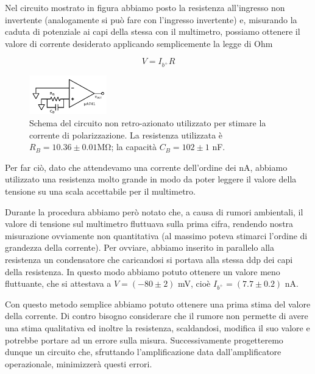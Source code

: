 Nel circuito mostrato in figura abbiamo posto la resistenza all'ingresso non invertente (analogamente si può fare con l'ingresso invertente) e, misurando la caduta di potenziale ai capi della stessa con il multimetro, possiamo ottenere il valore di corrente desiderato applicando semplicemente la legge di Ohm

$$V=I_{b^+} R$$


\begin{figure}
  \begin{center}
    \includegraphics[width=0.30\textwidth]{../E02/latex/direct_measure.pdf}
  \end{center}
  \caption{Schema del circuito non retro-azionato utilizzato per stimare la corrente di polarizzazione. La resistenza utilizzata è $R_B=10.36\pm0.01$\si{\mega\ohm}; la capacità $C_B=102 \pm 1$ \si{\nano\farad}.}
  \label{circuito:rel2_correnti_senzaretroazione}
\end{figure}


Per far ciò, dato che attendevamo una corrente dell'ordine dei \si{\nano\ampere}, abbiamo utilizzato una resistenza molto grande in modo da poter leggere il valore della tensione su una scala accettabile per il multimetro.

Durante la procedura abbiamo però notato che, a causa di rumori ambientali, il valore di tensione sul multimetro fluttuava sulla prima cifra, rendendo nostra misurazione ovviamente non quantitativa (al massimo poteva stimarci l'ordine di grandezza della corrente). Per ovviare, abbiamo inserito in parallelo alla resistenza un condensatore che caricandosi si portava alla stessa ddp dei capi della resistenza. In questo modo abbiamo potuto ottenere un valore meno fluttuante, che si attestava a $V=(-80 \pm 2)$ \si{\milli\volt}, cioè $I_{b^+}=(7.7 \pm 0.2)$ \si{\nano\ampere}.



Con questo metodo semplice abbiamo potuto ottenere una prima stima del valore della corrente. Di contro bisogno considerare che il rumore non permette di avere una stima qualitativa ed inoltre la resistenza, scaldandosi, modifica il suo valore e potrebbe portare ad un errore sulla misura. Successivamente progetteremo dunque un circuito che, sfruttando l'amplificazione data dall'amplificatore operazionale, minimizzerà questi errori.

